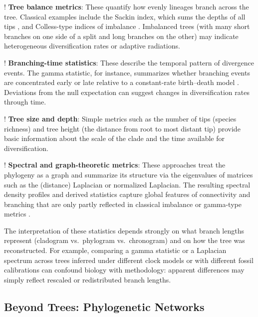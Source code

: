 \begin{fancyenumerate}
    \item! \textbf{Tree balance metrics}: These quantify how evenly lineages branch across the tree. Classical examples include the Sackin index, which sums the depths of all tips \citep{sackin_good_1972}, and Colless-type indices of imbalance \citep{janzen_phylogenetic_2024}. Imbalanced trees (with many short branches on one side of a split and long branches on the other) may indicate heterogeneous diversification rates or adaptive radiations.
    \item! \textbf{Branching-time statistics}: These describe the temporal pattern of divergence events. The gamma statistic, for instance, summarizes whether branching events are concentrated early or late relative to a constant-rate birth--death model \citep{pybus_testing_2000}. Deviations from the null expectation can suggest changes in diversification rates through time.
    \item! \textbf{Tree size and depth}: Simple metrics such as the number of tips (species richness) and tree height (the distance from root to most distant tip) provide basic information about the scale of the clade and the time available for diversification.
    \item! \textbf{Spectral and graph-theoretic metrics}: These approaches treat the phylogeny as a graph and summarize its structure via the eigenvalues of matrices such as the (distance) Laplacian or normalized Laplacian. The resulting spectral density profiles and derived statistics capture global features of connectivity and branching that are only partly reflected in classical imbalance or gamma-type metrics \citep{lewitus_characterizing_2016,chindelevitch_network_2021,janzen_phylogenetic_2024}.
\end{fancyenumerate}

The interpretation of these statistics depends strongly on what branch lengths represent (cladogram vs.\ phylogram vs.\ chronogram) and on how the tree was reconstructed. For example, comparing a gamma statistic or a Laplacian spectrum across trees inferred under different clock models or with different fossil calibrations can confound biology with methodology: apparent differences may simply reflect rescaled or redistributed branch lengths.

\subsection{Beyond Trees: Phylogenetic Networks}

